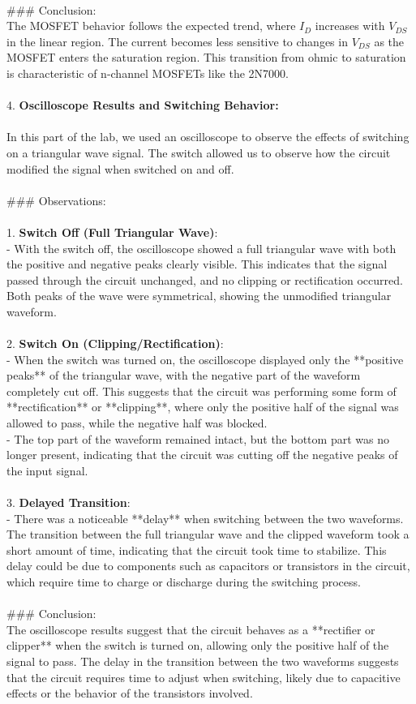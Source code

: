 \documentclass{article}
\begin{document}
\\
### Conclusion:\\ 
The MOSFET behavior follows the expected trend, where \( I_D \) increases with \( V_{DS} \) in the linear region. The current becomes less sensitive to changes in \( V_{DS} \) as the MOSFET enters the saturation region. This transition from ohmic to saturation is characteristic of n-channel MOSFETs like the 2N7000.
\\ \\ 

4. \textbf{Oscilloscope Results and Switching Behavior:} \\  \\ 

In this part of the lab, we used an oscilloscope to observe the effects of switching on a triangular wave signal. The switch allowed us to observe how the circuit modified the signal when switched on and off.
\\ \\
### Observations:\\ 
\\
1. \textbf{Switch Off (Full Triangular Wave)}: \\
   - With the switch off, the oscilloscope showed a full triangular wave with both the positive and negative peaks clearly visible. This indicates that the signal passed through the circuit unchanged, and no clipping or rectification occurred. Both peaks of the wave were symmetrical, showing the unmodified triangular waveform.
\\ \\ 
2. \textbf{Switch On (Clipping/Rectification)}: \\ 
   - When the switch was turned on, the oscilloscope displayed only the **positive peaks** of the triangular wave, with the negative part of the waveform completely cut off. This suggests that the circuit was performing some form of **rectification** or **clipping**, where only the positive half of the signal was allowed to pass, while the negative half was blocked.
   \\
   - The top part of the waveform remained intact, but the bottom part was no longer present, indicating that the circuit was cutting off the negative peaks of the input signal.
\\ \\ 
3. \textbf{Delayed Transition}:\\ 
   - There was a noticeable **delay** when switching between the two waveforms. The transition between the full triangular wave and the clipped waveform took a short amount of time, indicating that the circuit took time to stabilize. This delay could be due to components such as capacitors or transistors in the circuit, which require time to charge or discharge during the switching process.
\\ \\ 
### Conclusion: \\ 
The oscilloscope results suggest that the circuit behaves as a **rectifier or clipper** when the switch is turned on, allowing only the positive half of the signal to pass. The delay in the transition between the two waveforms suggests that the circuit requires time to adjust when switching, likely due to capacitive effects or the behavior of the transistors involved.
\end{document}
